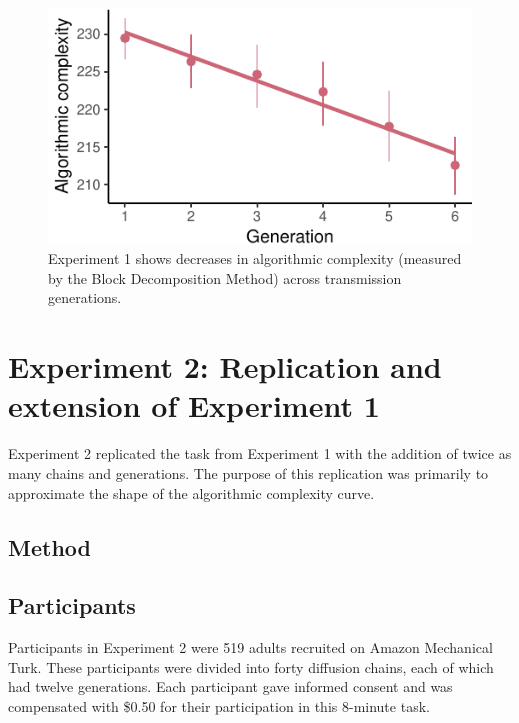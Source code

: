\documentclass[10pt, letterpaper]{article}
\newenvironment{CodeChunk}{}{}
\begin{document}
\begin{CodeChunk}
\begin{figure}[tb]

{\centering \includegraphics{figs/e1_bdm_plot-1} 

}

\caption[Experiment 1 shows decreases in algorithmic complexity (measured by the Block Decomposition Method) across transmission generations]{Experiment 1 shows decreases in algorithmic complexity (measured by the Block Decomposition Method) across transmission generations.}\label{fig:e1_bdm_plot}
\end{figure}
\end{CodeChunk}

\section{Experiment 2: Replication and extension of Experiment
1}\label{experiment-2-replication-and-extension-of-experiment-1}

Experiment 2 replicated the task from Experiment 1 with the addition of
twice as many chains and generations. The purpose of this replication
was primarily to approximate the shape of the algorithmic complexity
curve.

\subsection{Method}\label{method-1}

\subsection{Participants}\label{participants-1}

Participants in Experiment 2 were 519 adults recruited on Amazon
Mechanical Turk. These participants were divided into forty diffusion
chains, each of which had twelve generations. Each participant gave
informed consent and was compensated with \$0.50 for their participation
in this 8-minute task.
\end{document}
